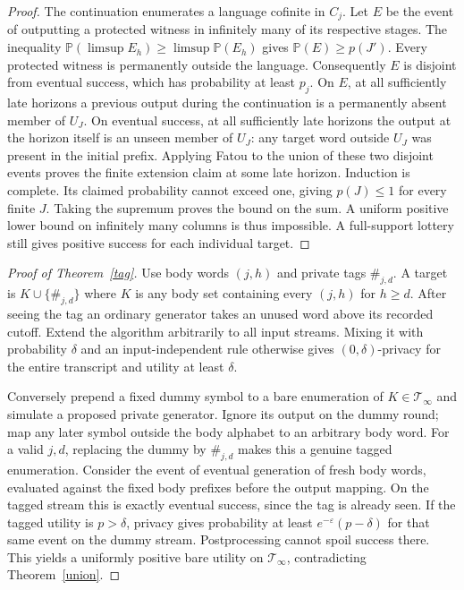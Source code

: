 \documentclass[11pt]{article}
\newcommand{\Pp}{\mathbb P}
\begin{document}
\begin{proof}
The continuation enumerates a language cofinite in $C_j$. Let $E$ be the event of outputting a protected witness in infinitely many of its respective stages. The inequality $\Pp(\limsup E_h)\ge\limsup\Pp(E_h)$ gives $\Pp(E)\ge p(J')$. Every protected witness is permanently outside the language. Consequently $E$ is disjoint from eventual success, which has probability at least $p_j$. On $E$, at all sufficiently late horizons a previous output during the continuation is a permanently absent member of $U_J$. On eventual success, at all sufficiently late horizons the output at the horizon itself is an unseen member of $U_J$: any target word outside $U_J$ was present in the initial prefix. Applying Fatou to the union of these two disjoint events proves the finite extension claim at some late horizon. Induction is complete. Its claimed probability cannot exceed one, giving $p(J)\le1$ for every finite $J$. Taking the supremum proves the bound on the sum. A uniform positive lower bound on infinitely many columns is thus impossible. A full-support lottery still gives positive success for each individual target.
\end{proof}

\begin{proof}[Proof of Theorem~\ref{tag}]
Use body words $(j,h)$ and private tags $\#_{j,d}$. A target is $K\cup\{\#_{j,d}\}$ where $K$ is any body set containing every $(j,h)$ for $h\ge d$. After seeing the tag an ordinary generator takes an unused word above its recorded cutoff. Extend the algorithm arbitrarily to all input streams. Mixing it with probability $\delta$ and an input-independent rule otherwise gives $(0,\delta)$-privacy for the entire transcript and utility at least $\delta$.

Conversely prepend a fixed dummy symbol to a bare enumeration of $K\in\mathcal T_\infty$ and simulate a proposed private generator. Ignore its output on the dummy round; map any later symbol outside the body alphabet to an arbitrary body word. For a valid $j,d$, replacing the dummy by $\#_{j,d}$ makes this a genuine tagged enumeration. Consider the event of eventual generation of fresh body words, evaluated against the fixed body prefixes before the output mapping. On the tagged stream this is exactly eventual success, since the tag is already seen. If the tagged utility is $p>\delta$, privacy gives probability at least $e^{-\varepsilon}(p-\delta)$ for that same event on the dummy stream. Postprocessing cannot spoil success there. This yields a uniformly positive bare utility on $\mathcal T_\infty$, contradicting Theorem~\ref{union}.
\end{proof}
\end{document}
